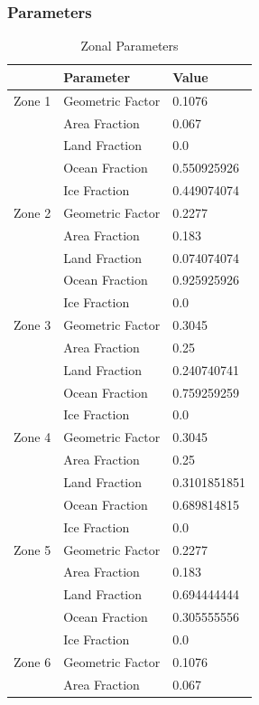 \documentclass{article}
\begin{document}
\subsubsection{Parameters}
\begin{table}[H]
    \parbox{.45\linewidth}{
    \captionsetup{singlelinecheck = false, justification=justified}
    \caption{Zonal Parameters}
    \begin{tabular}{lll}
    \hline
     & Parameter & Value \\
    \hline
    Zone 1 & Geometric Factor & 0.1076 \\
     & Area Fraction & 0.067 \\
     & Land Fraction & 0.0 \\
     & Ocean Fraction & 0.550925926 \\ 
     & Ice Fraction & 0.449074074 \\
    \hline
    Zone 2 & Geometric Factor & 0.2277 \\
     & Area Fraction & 0.183 \\
     & Land Fraction & 0.074074074 \\
     & Ocean Fraction & 0.925925926 \\ 
     & Ice Fraction & 0.0\\
    \hline
    Zone 3 & Geometric Factor & 0.3045 \\
     & Area Fraction & 0.25 \\
     & Land Fraction & 0.240740741 \\
     & Ocean Fraction & 0.759259259 \\ 
     & Ice Fraction & 0.0\\
    \hline
    Zone 4 & Geometric Factor & 0.3045 \\
     & Area Fraction & 0.25 \\
     & Land Fraction & 0.3101851851 \\
     & Ocean Fraction & 0.689814815 \\ 
     & Ice Fraction & 0.0\\
    \hline
    Zone 5 & Geometric Factor & 0.2277 \\
     & Area Fraction & 0.183 \\
     & Land Fraction & 0.694444444 \\
     & Ocean Fraction & 0.305555556 \\ 
     & Ice Fraction & 0.0\\
    \hline
    Zone 6 & Geometric Factor & 0.1076 \\
     & Area Fraction & 0.067 \\

\end{tabular}}
\end{table}
\end{document}
